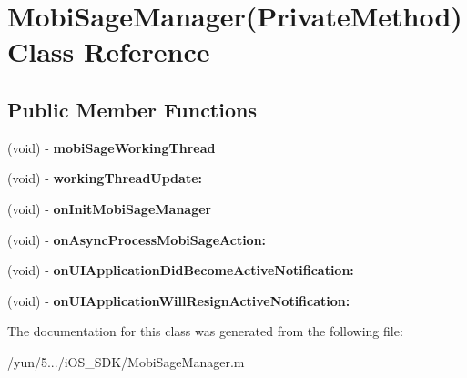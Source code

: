 \hypertarget{interface_mobi_sage_manager_07_private_method_08}{\section{\-Mobi\-Sage\-Manager(\-Private\-Method) \-Class \-Reference}
\label{interface_mobi_sage_manager_07_private_method_08}
}
\subsection*{\-Public \-Member \-Functions}
\begin{DoxyCompactItemize}
\item 
\hypertarget{interface_mobi_sage_manager_07_private_method_08_a193cff51bf63b822130de0ed36364d30}{(void) -\/ {\bfseries mobi\-Sage\-Working\-Thread}}\label{interface_mobi_sage_manager_07_private_method_08_a193cff51bf63b822130de0ed36364d30}

\item 
\hypertarget{interface_mobi_sage_manager_07_private_method_08_af9e4dc07e3a1cf23e1a0222914430f1e}{(void) -\/ {\bfseries working\-Thread\-Update\-:}}\label{interface_mobi_sage_manager_07_private_method_08_af9e4dc07e3a1cf23e1a0222914430f1e}

\item 
\hypertarget{interface_mobi_sage_manager_07_private_method_08_a7c9f0c47ee5429b2b2a2fd81096da22d}{(void) -\/ {\bfseries on\-Init\-Mobi\-Sage\-Manager}}\label{interface_mobi_sage_manager_07_private_method_08_a7c9f0c47ee5429b2b2a2fd81096da22d}

\item 
\hypertarget{interface_mobi_sage_manager_07_private_method_08_a9f130853bb639ba23a5ec8bf968a732a}{(void) -\/ {\bfseries on\-Async\-Process\-Mobi\-Sage\-Action\-:}}\label{interface_mobi_sage_manager_07_private_method_08_a9f130853bb639ba23a5ec8bf968a732a}

\item 
\hypertarget{interface_mobi_sage_manager_07_private_method_08_a216a080f2b4376aaabd9ac33e622d338}{(void) -\/ {\bfseries on\-U\-I\-Application\-Did\-Become\-Active\-Notification\-:}}\label{interface_mobi_sage_manager_07_private_method_08_a216a080f2b4376aaabd9ac33e622d338}

\item 
\hypertarget{interface_mobi_sage_manager_07_private_method_08_a6d151902321517117f4a3788668c1f88}{(void) -\/ {\bfseries on\-U\-I\-Application\-Will\-Resign\-Active\-Notification\-:}}\label{interface_mobi_sage_manager_07_private_method_08_a6d151902321517117f4a3788668c1f88}

\end{DoxyCompactItemize}


\-The documentation for this class was generated from the following file\-:\begin{DoxyCompactItemize}
\item 
/yun/5.../i\-O\-S\-\_\-\-S\-D\-K/\-Mobi\-Sage\-Manager.\-m\end{DoxyCompactItemize}
